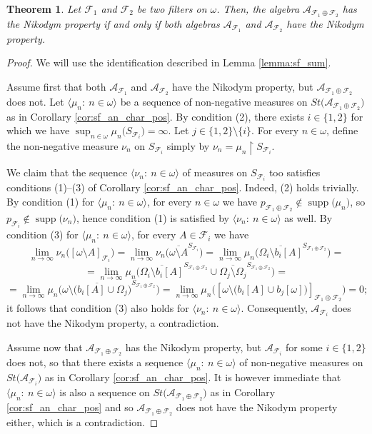 \documentclass[a4paper,11pt,fleqn]{amsart}
\newtheorem{theorem}{Theorem}[section]
\theoremstyle{definition}
\theoremstyle{remark}
\numberwithin{equation}{section}
\newcommand{\N}{\mathbb{N}}
\newcommand{\aA}{\mathcal{A}}
\newcommand{\fF}{\mathcal{F}}
\newcommand{\rstr}{\restriction}
\newcommand{\sm}{\setminus}
\DeclareMathOperator{\supp}{supp}
\newcommand{\seqn}[1]{\big\langle#1\colon\ n\io\big\rangle}
\newcommand{\clopen}[1]{\left[#1\right]}
\newcommand{\io}{\in\omega}%
\begin{document}
\begin{theorem}\label{thm:nikodym_sum}
    Let $\fF_1$ and $\fF_2$ be two filters on $\omega$. Then, the algebra $\aA_{\fF_1\oplus \fF_2}$ has the Nikodym property if and only if both algebras $\aA_{\fF_1}$ and $\aA_{\fF_2}$ have the Nikodym property.
\end{theorem}
\begin{proof}
    We will use the identification described in Lemma \ref{lemma:sf_sum}. 
    
    Assume first that both $\aA_{\fF_1}$ and $\aA_{\fF_2}$ have the Nikodym property, but $\aA_{\fF_1\oplus \fF_2}$ does not. Let $\seqn{\mu_n}$ be a sequence of non-negative measures on $St\big(\aA_{\fF_1\oplus \fF_2}\big)$ as in Corollary \ref{cor:sf_an_char_pos}. By condition (2), there exists $i\in\{1,2\}$ for which we have $\sup_{n\io}\mu_n\big(S_{\fF_i}\big)=\infty$. Let $j\in\{1,2\}\sm\{i\}$. For every $n\io$, define the non-negative measure $\nu_n$ on $S_{\fF_i}$ simply by $\nu_n=\mu_n\rstr S_{\fF_i}$.

    We claim that the sequence $\seqn{\nu_n}$ of measures on $S_{\fF_i}$ too satisfies conditions (1)--(3) of Corollary  \ref{cor:sf_an_char_pos}. Indeed, (2) holds trivially. By condition (1) for $\seqn{\mu_n}$, for every $n\io$ we have $p_{\fF_1\oplus \fF_2}\not\in\supp\big(\mu_n\big)$, so $p_{\fF_i}\not\in\supp\big(\nu_n\big)$, hence condition (1) is satisfied by $\seqn{\nu_n}$ as well. By condition (3) for $\seqn{\mu_n}$, for every $A\in \fF_i$ we have
    \[\lim_{n\to\infty}\nu_n\big(\clopen{\omega\sm A}_{\fF_i}\big)=\lim_{n\to\infty}\nu_n\Big(\overline{\omega\sm A}^{S_{\fF_i}}\Big)=\lim_{n\to\infty}\mu_n\Big(\overline{\Omega_i\sm b_i[A]}^{S_{\fF_1\oplus\fF_2}}\Big)=\]
    \[=\lim_{n\to\infty}\mu_n\Big(\overline{\Omega_i\sm b_i[A]}^{S_{\fF_1\oplus\fF_2}}\cup\overline{\Omega_{j}\sm\Omega_{j}}^{S_{\fF_1\oplus\fF_2}}\Big)=\]
    \[=\lim_{n\to\infty}\mu_n\Big(\overline{\omega\sm\big(b_i[A]\cup\Omega_{j}\big)}^{S_{\fF_1\oplus\fF_2}}\Big)=\lim_{n\to\infty}\mu_n\Big(\clopen{\omega\sm\big(b_i[A]\cup b_{j}[\omega]\big)}_{\fF_1\oplus\fF_2}\Big)=0;\]
    it follows that condition (3) also holds for $\seqn{\nu_n}$. Consequently, $\aA_{\fF_i}$ does not have the Nikodym property, a contradiction.

    Assume now that $\aA_{\fF_1\oplus\fF_2}$ has the Nikodym property, but $\aA_{\fF_i}$ for some $i\in\{1,2\}$ does not, so that there exists a sequence $\seqn{\mu_n}$ of non-negative measures on $St\big(\aA_{\fF_i}\big)$ as in Corollary \ref{cor:sf_an_char_pos}. It is however immediate that $\seqn{\mu_n}$ is also a sequence on $St\big(\aA_{\fF_1\oplus\fF_2}\big)$ as in Corollary \ref{cor:sf_an_char_pos} and so $\aA_{\fF_1\oplus\fF_2}$ does not have the Nikodym property either, which is a contradiction.
\end{proof}
\end{document}
